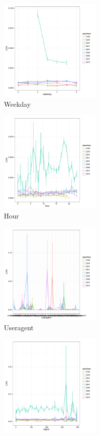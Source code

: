 \begin{figure}[htbp]

\begin{subfigure}{0.5\textwidth}
\includegraphics[width=0.9\linewidth, height=5cm]{weekday.pdf}
\caption{Weekday}
\label{fig:weekday}
\end{subfigure}
\begin{subfigure}{0.5\textwidth}
\includegraphics[width=0.9\linewidth, height=5cm]{hour.pdf}
\caption{Hour}
\label{fig:hour}
\end{subfigure}
\begin{subfigure}{0.5\textwidth}
\includegraphics[width=0.9\linewidth, height=5cm]{useragent.pdf}
\caption{Useragent}
\label{fig:useragent}
\end{subfigure}
\begin{subfigure}{0.5\textwidth}
\includegraphics[width=0.9\linewidth, height=5cm]{region.pdf}

\end{subfigure}
\end{figure}
